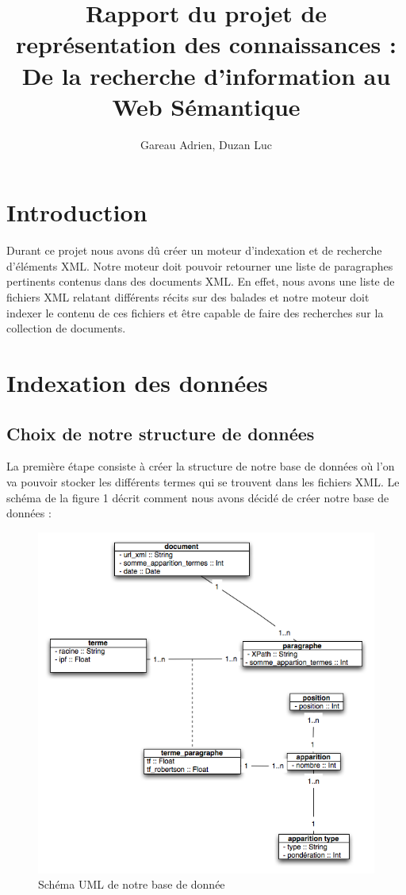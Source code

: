 \documentclass{article}
\title{Rapport du projet de représentation des connaissances :\\
De la recherche d'information au Web Sémantique}
\author{Gareau Adrien, Duzan Luc}
\begin{document}
\renewcommand{\labelitemi}{$\bullet$}
\maketitle
\section{Introduction}

Durant ce projet nous avons dû créer un moteur d'indexation et de recherche
d'éléments XML. Notre moteur doit pouvoir retourner une liste de paragraphes
pertinents contenus dans des documents XML. En effet, nous avons une liste de
fichiers XML relatant différents récits sur des balades et notre moteur doit indexer
le contenu de ces fichiers et être capable de faire des recherches sur la collection
de documents.

\section{Indexation des données}

\subsection{Choix de notre structure de données}
La première étape consiste à créer la structure de notre base de données où l’on va
pouvoir stocker les différents termes qui se trouvent dans les fichiers XML. Le
schéma de la figure 1 décrit comment nous avons décidé de créer notre base de données : 

\begin{figure}[h!]
    \centering
    \caption{\label{schéma UML de notre base de donnée} Schéma UML de notre base de
donnée}
    \includegraphics[scale=0.7]{schema_db.png}
\end{figure}
\end{document}
